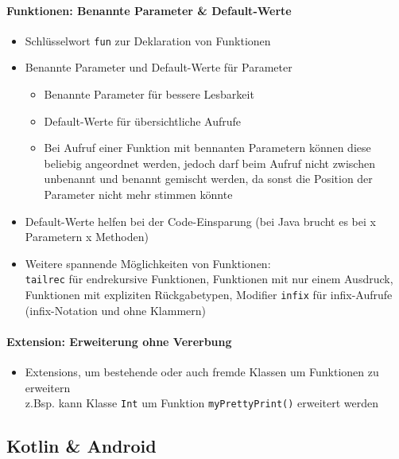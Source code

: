 \documentclass[a4paper]{article}
\begin{document}
			\paragraph{Funktionen: Benannte Parameter \& Default-Werte}
			\begin{itemize}
				\item Schlüsselwort \texttt{fun} zur Deklaration von Funktionen
				\item Benannte Parameter und Default-Werte für Parameter
				\begin{itemize}
					\item Benannte Parameter für bessere Lesbarkeit
					\item Default-Werte für übersichtliche Aufrufe
					\item Bei Aufruf einer Funktion mit bennanten Parametern können diese beliebig angeordnet werden, 
					jedoch darf beim Aufruf nicht zwischen unbenannt und benannt gemischt werden, da sonst die Position der Parameter nicht mehr stimmen könnte
				\end{itemize}
				\item Default-Werte helfen bei der Code-Einsparung (bei Java brucht es bei x Parametern x Methoden)
				\item Weitere spannende Möglichkeiten von Funktionen:\\
					\texttt{tailrec} für endrekursive Funktionen, Funktionen mit nur einem Ausdruck, Funktionen mit expliziten Rückgabetypen, Modifier \texttt{infix} für infix-Aufrufe (infix-Notation und ohne Klammern)
			\end{itemize}
		
			\paragraph{Extension: Erweiterung ohne Vererbung}
			\begin{itemize}
				\item Extensions, um bestehende oder auch fremde Klassen um Funktionen zu erweitern\\
					z.Bsp. kann Klasse \texttt{Int} um Funktion \texttt{myPrettyPrint()} erweitert werden
			\end{itemize}
	
		\newpage	
	
		\subsection{Kotlin \& Android}
		
\end{document}
